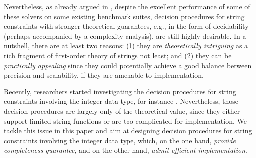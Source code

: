 Nevertheless, as already argued in \cite{CHL+19}, despite the excellent performance of some of these solvers on some existing benchmark suites, decision procedures for string constraints with stronger theoretical guarantees, e.g., in the form of decidability (perhaps accompanied by a complexity analysis), are still highly desirable. In a nutshell, there are at least two reasons: (1) they are \emph{theoretically intriguing} as a rich fragment of first-order theory of strings not least; %
and  %
(2) they can be \emph{practically appealing} since they could potentially achieve a good balance between precision and scalability, if they are amenable to implementation. 


Recently, researchers started investigating the decision procedures for string constraints involving the integer data type, for instance \cite{Vijay-length,LeH18,LinM18,LB16}. Nevertheless, those decision procedures are largely only of the theoretical value, since they either support limited string functions or are too complicated for  implementation. 
We tackle this issue in this paper and aim at designing decision procedures for string constraints involving the integer data type, which, on the one hand, \emph{provide completeness guarantee}, and on the other hand, \emph{admit efficient implementation}.

